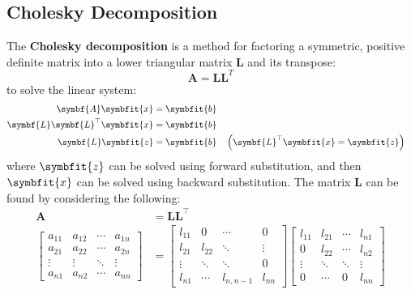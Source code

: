 \documentclass{article}
\begin{document}
\subsection{Cholesky Decomposition}
The \textbf{Cholesky decomposition} is a method for factoring a symmetric, positive definite matrix into a lower triangular matrix \(\symbf{L}\) and its transpose:
\begin{equation*}
    \symbf{A} = \symbf{L} \symbf{L}^T
\end{equation*}
to solve the linear system:
\begin{align*}
    \symbf{A} \symbfit{x}                & = \symbfit{b}                                                              \\
    \symbf{L} \symbf{L}^\top \symbfit{x} & = \symbfit{b}                                                              \\
    \symbf{L} \symbfit{z}                & = \symbfit{b} &  & \left( \symbf{L}^\top \symbfit{x} = \symbfit{z} \right)
\end{align*}
where \(\symbfit{z}\) can be solved using forward substitution, and then \(\symbfit{x}\) can be solved using backward substitution.
The matrix \(\symbf{L}\) can be found by considering the following:
\begin{align*}
    \symbf{A}                            & = \symbf{L} \symbf{L}^\top \\
    \begin{bmatrix*}
        a_{11} & a_{12} & \cdots & a_{1n} \\
        a_{21} & a_{22} & \cdots & a_{2n} \\
        \vdots & \vdots & \ddots & \vdots \\
        a_{n1} & a_{n2} & \cdots & a_{nn}
    \end{bmatrix*} & =
    \begin{bmatrix*}
        l_{11} & 0      & \cdots & 0      \\
        l_{21} & l_{22} & \ddots & \vdots      \\
        \vdots & \ddots & \ddots & 0 \\
        l_{n1} & \cdots & l_{n,n-1} & l_{nn}
    \end{bmatrix*}
    \begin{bmatrix*}
        l_{11} & l_{21} & \cdots & l_{n1} \\
        0      & l_{22} & \cdots & l_{n2} \\
        \vdots & \ddots & \ddots & \vdots \\
        0      & \cdots & 0      & l_{nn}
    \end{bmatrix*}
\end{align*}
\end{document}
